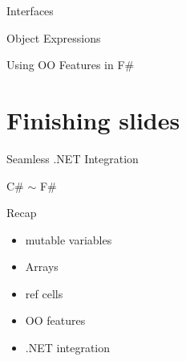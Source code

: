 \documentclass{beamer}
\begin{document}
\begin{frame}{Interfaces}
\end{frame}

\begin{frame}{Object Expressions}
\end{frame}

\begin{frame}{Using OO Features in F\#}
\end{frame}

\section{Finishing slides}
\frame{\tableofcontents[currentsection]}

\begin{frame}{Seamless .NET Integration}
\end{frame}

\begin{frame}{C\# $\sim$ F\#}
\end{frame}

\begin{frame}{Recap}
  \begin{itemize}[<+->]
    \item mutable variables
    \item Arrays
    \item ref cells
    \item OO features
    \item .NET integration
  \end{itemize}
\end{frame}
\end{document}
